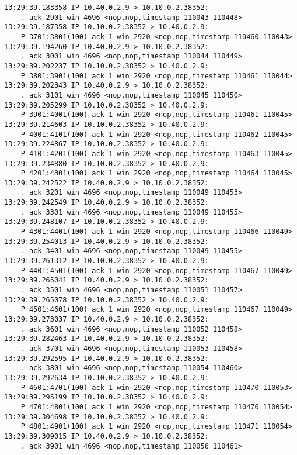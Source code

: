 \documentclass[a4paper,12pt]{article}
\begin{document}
\begin{Verbatim}
13:29:39.183358 IP 10.40.0.2.9 > 10.10.0.2.38352: 
    . ack 2901 win 4696 <nop,nop,timestamp 110043 110448>
13:29:39.187358 IP 10.10.0.2.38352 > 10.40.0.2.9: 
    P 3701:3801(100) ack 1 win 2920 <nop,nop,timestamp 110460 110043>
13:29:39.194260 IP 10.40.0.2.9 > 10.10.0.2.38352: 
    . ack 3001 win 4696 <nop,nop,timestamp 110044 110449>
13:29:39.202237 IP 10.10.0.2.38352 > 10.40.0.2.9: 
    P 3801:3901(100) ack 1 win 2920 <nop,nop,timestamp 110461 110044>
13:29:39.202343 IP 10.40.0.2.9 > 10.10.0.2.38352: 
    . ack 3101 win 4696 <nop,nop,timestamp 110045 110450>
13:29:39.205299 IP 10.10.0.2.38352 > 10.40.0.2.9: 
    P 3901:4001(100) ack 1 win 2920 <nop,nop,timestamp 110461 110045>
13:29:39.214603 IP 10.10.0.2.38352 > 10.40.0.2.9: 
    P 4001:4101(100) ack 1 win 2920 <nop,nop,timestamp 110462 110045>
13:29:39.224867 IP 10.10.0.2.38352 > 10.40.0.2.9: 
    P 4101:4201(100) ack 1 win 2920 <nop,nop,timestamp 110463 110045>
13:29:39.234880 IP 10.10.0.2.38352 > 10.40.0.2.9: 
    P 4201:4301(100) ack 1 win 2920 <nop,nop,timestamp 110464 110045>
13:29:39.242522 IP 10.40.0.2.9 > 10.10.0.2.38352: 
    . ack 3201 win 4696 <nop,nop,timestamp 110049 110453>
13:29:39.242549 IP 10.40.0.2.9 > 10.10.0.2.38352: 
    . ack 3301 win 4696 <nop,nop,timestamp 110049 110455>
13:29:39.248107 IP 10.10.0.2.38352 > 10.40.0.2.9: 
    P 4301:4401(100) ack 1 win 2920 <nop,nop,timestamp 110466 110049>
13:29:39.254013 IP 10.40.0.2.9 > 10.10.0.2.38352: 
    . ack 3401 win 4696 <nop,nop,timestamp 110049 110455>
13:29:39.261312 IP 10.10.0.2.38352 > 10.40.0.2.9: 
    P 4401:4501(100) ack 1 win 2920 <nop,nop,timestamp 110467 110049>
13:29:39.265041 IP 10.40.0.2.9 > 10.10.0.2.38352: 
    . ack 3501 win 4696 <nop,nop,timestamp 110051 110457>
13:29:39.265078 IP 10.10.0.2.38352 > 10.40.0.2.9: 
    P 4501:4601(100) ack 1 win 2920 <nop,nop,timestamp 110467 110049>
13:29:39.273037 IP 10.40.0.2.9 > 10.10.0.2.38352: 
    . ack 3601 win 4696 <nop,nop,timestamp 110052 110458>
13:29:39.282463 IP 10.40.0.2.9 > 10.10.0.2.38352: 
    . ack 3701 win 4696 <nop,nop,timestamp 110053 110458>
13:29:39.292595 IP 10.40.0.2.9 > 10.10.0.2.38352: 
    . ack 3801 win 4696 <nop,nop,timestamp 110054 110460>
13:29:39.292634 IP 10.10.0.2.38352 > 10.40.0.2.9: 
    P 4601:4701(100) ack 1 win 2920 <nop,nop,timestamp 110470 110053>
13:29:39.295199 IP 10.10.0.2.38352 > 10.40.0.2.9: 
    P 4701:4801(100) ack 1 win 2920 <nop,nop,timestamp 110470 110054>
13:29:39.304698 IP 10.10.0.2.38352 > 10.40.0.2.9: 
    P 4801:4901(100) ack 1 win 2920 <nop,nop,timestamp 110471 110054>
13:29:39.309015 IP 10.40.0.2.9 > 10.10.0.2.38352: 
    . ack 3901 win 4696 <nop,nop,timestamp 110056 110461>

\end{Verbatim}
\end{document}
